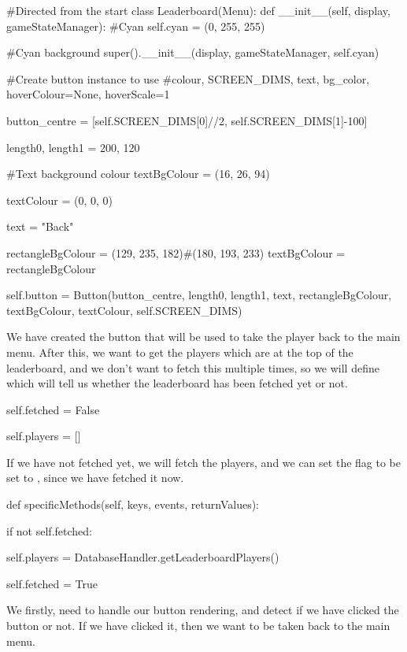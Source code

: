 \begin{mpy}
#Directed from the start
class Leaderboard(Menu):
    def __init__(self, display, gameStateManager):
        #Cyan
        self.cyan = (0, 255, 255)

        #Cyan background
        super().__init__(display, gameStateManager, self.cyan)

        #Create button instance to use
        #colour, SCREEN_DIMS, text, bg_color, hoverColour=None, hoverScale=1

        button_centre = [self.SCREEN_DIMS[0]//2, self.SCREEN_DIMS[1]-100]

        length0, length1 = 200, 120

        #Text background colour
        textBgColour = (16, 26, 94)

        textColour = (0, 0, 0)

        text = "Back"

        rectangleBgColour = (129, 235, 182)#(180, 193, 233)
        textBgColour = rectangleBgColour

        self.button = Button(button_centre, length0, length1, text, rectangleBgColour, textBgColour, textColour, self.SCREEN_DIMS)
\end{mpy}

We have created the button that will be used to take the player back to the main menu. After this, we want to get the players which are at the top of the leaderboard, and we don't want to fetch this multiple times, so we will define  which will tell us whether the leaderboard has been fetched yet or not.

\begin{mpy}
        self.fetched = False

        self.players = []
\end{mpy}

If we have not fetched yet, we will fetch the players, and we can set the  flag to be set to , since we have fetched it now.

\begin{mpy}
    def specificMethods(self, keys, events, returnValues):

        if not self.fetched:
            
            self.players = DatabaseHandler.getLeaderboardPlayers()

            self.fetched = True
\end{mpy}


We firstly, need to handle our button rendering, and detect if we have clicked the button or not. If we have clicked it, then we want to be taken back to the main menu.

